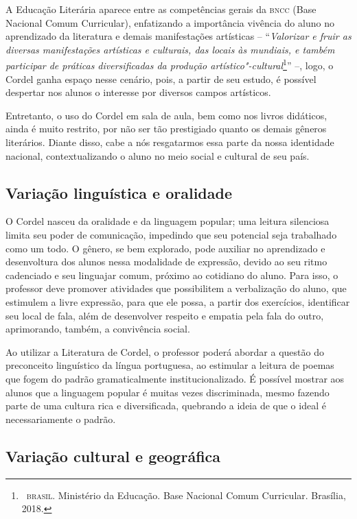 \documentclass{article}
\begin{document}
A Educação Literária aparece entre as competências gerais da \textsc{bncc} (Base
Nacional Comum Curricular), enfatizando a importância vivência do aluno
no aprendizado da literatura e demais manifestações artísticas --
``\emph{Valorizar e fruir as diversas manifestações artísticas e
culturais, das locais às mundiais, e também participar de práticas
diversificadas da produção artístico"-cultural}\footnote{~\textsc{brasil}.
  Ministério da Educação. Base Nacional Comum Curricular. Brasília,
  2018.}'' --, logo, o Cordel ganha espaço nesse cenário, pois, a
partir de seu estudo, é possível despertar nos alunos o interesse por
diversos campos artísticos.

Entretanto, o uso do Cordel em sala de aula, bem como nos livros
didáticos, ainda é muito restrito, por não ser tão prestigiado quanto os
demais gêneros literários. Diante disso, cabe a nós resgatarmos essa
parte da nossa identidade nacional, contextualizando o aluno no meio
social e cultural de seu país.

\subsection{Variação linguística e oralidade}

O Cordel nasceu da oralidade e da linguagem popular; uma leitura
silenciosa limita seu poder de comunicação, impedindo que seu potencial
seja trabalhado como um todo. O gênero, se bem explorado, pode auxiliar
no aprendizado e desenvoltura dos alunos nessa modalidade de expressão,
devido ao seu ritmo cadenciado e seu linguajar comum, próximo ao
cotidiano do aluno. Para isso, o professor deve promover atividades que
possibilitem a verbalização do aluno, que estimulem a livre expressão,
para que ele possa, a partir dos exercícios, identificar seu local de
fala, além de desenvolver respeito e empatia pela fala do outro,
aprimorando, também, a convivência social.

Ao utilizar a Literatura de Cordel, o professor poderá abordar a questão
do preconceito linguístico da língua portuguesa, ao estimular a leitura
de poemas que fogem do padrão gramaticalmente institucionalizado. É
possível mostrar aos alunos que a linguagem popular é muitas vezes
discriminada, mesmo fazendo parte de uma cultura rica e diversificada,
quebrando a ideia de que o ideal é necessariamente o padrão.

\subsection{Variação cultural e geográfica}
\end{document}
